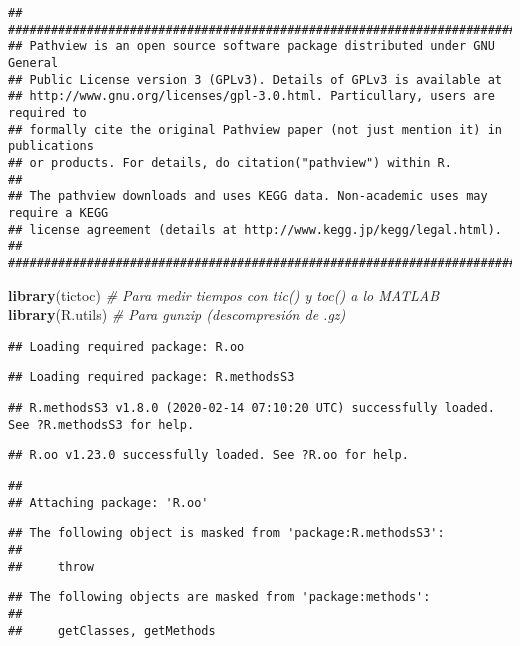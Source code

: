 \documentclass[
]{article}
\newenvironment{Shaded}{\begin{snugshade}}{\end{snugshade}}
\newcommand{\CommentTok}[1]{\textcolor[rgb]{0.56,0.35,0.01}{\textit{#1}}}
\newcommand{\KeywordTok}[1]{\textcolor[rgb]{0.13,0.29,0.53}{\textbf{#1}}}
\newcommand{\NormalTok}[1]{#1}
\begin{document}
\begin{verbatim}
## ##############################################################################
## Pathview is an open source software package distributed under GNU General
## Public License version 3 (GPLv3). Details of GPLv3 is available at
## http://www.gnu.org/licenses/gpl-3.0.html. Particullary, users are required to
## formally cite the original Pathview paper (not just mention it) in publications
## or products. For details, do citation("pathview") within R.
## 
## The pathview downloads and uses KEGG data. Non-academic uses may require a KEGG
## license agreement (details at http://www.kegg.jp/kegg/legal.html).
## ##############################################################################
\end{verbatim}

\begin{Shaded}
\begin{Highlighting}[]
\KeywordTok{library}\NormalTok{(tictoc)      }\CommentTok{# Para medir tiempos con tic() y toc() a lo MATLAB }
\KeywordTok{library}\NormalTok{(R.utils)     }\CommentTok{# Para gunzip (descompresión de .gz)}
\end{Highlighting}
\end{Shaded}

\begin{verbatim}
## Loading required package: R.oo
\end{verbatim}

\begin{verbatim}
## Loading required package: R.methodsS3
\end{verbatim}

\begin{verbatim}
## R.methodsS3 v1.8.0 (2020-02-14 07:10:20 UTC) successfully loaded. See ?R.methodsS3 for help.
\end{verbatim}

\begin{verbatim}
## R.oo v1.23.0 successfully loaded. See ?R.oo for help.
\end{verbatim}

\begin{verbatim}
## 
## Attaching package: 'R.oo'
\end{verbatim}

\begin{verbatim}
## The following object is masked from 'package:R.methodsS3':
## 
##     throw
\end{verbatim}

\begin{verbatim}
## The following objects are masked from 'package:methods':
## 
##     getClasses, getMethods
\end{verbatim}
\end{document}
